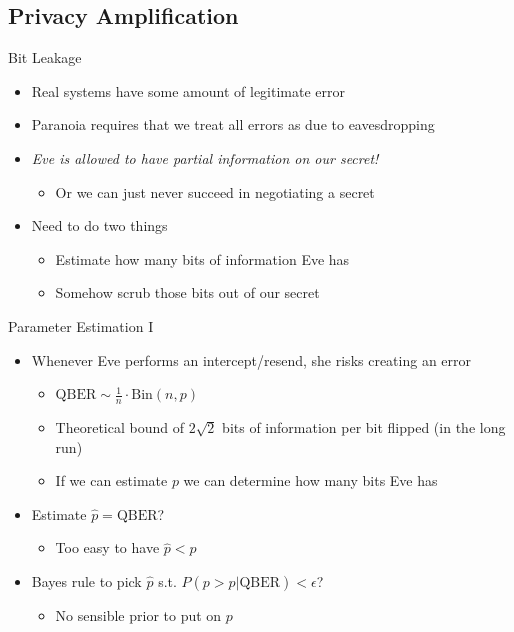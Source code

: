 \documentclass[pdf]{beamer}
\begin{document}
\subsection{Privacy Amplification}
\begin{frame}{Bit Leakage}
  \begin{itemize}
  \item Real systems have some amount of legitimate error
  \pause\item Paranoia requires that we treat all errors as due to eavesdropping
  \pause\item \emph{Eve is allowed to have partial information on our secret!}
    \begin{itemize}
    \item Or we can just never succeed in negotiating a secret
    \end{itemize}
  \pause\item Need to do two things
    \begin{itemize}
    \item Estimate how many bits of information Eve has
    \item Somehow scrub those bits out of our secret
    \end{itemize}
  \end{itemize}
\end{frame}
\begin{frame}{Parameter Estimation I}
  \begin{itemize}
  \item Whenever Eve performs an intercept/resend, she risks creating an error
    \begin{itemize}
    \item $\text{QBER} \sim \frac{1}{n} \cdot \text{Bin}(n, p)$
    \pause\item Theoretical bound of $2 \sqrt{2}$ bits of information per bit flipped (in the long run)
    \pause\item If we can estimate $p$ we can determine how many bits Eve has
    \end{itemize}
  \pause\item Estimate $\hat{p} = \text{QBER}$?
    \begin{itemize}
    \item Too easy to have $\hat{p} < p$
    \end{itemize}
  \pause\item Bayes rule to pick $\hat{p}$ s.t. $P(p > \hat{p} | \text{QBER}) < \epsilon$?
    \begin{itemize}
    \item No sensible prior to put on $p$
    \end{itemize}
  \end{itemize}
\end{frame}
\end{document}

